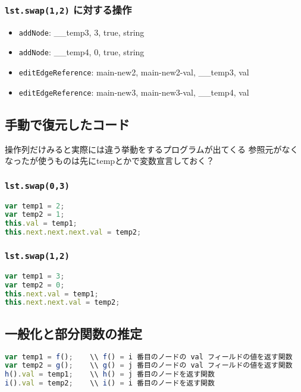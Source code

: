 \documentclass{article}
\begin{document}
\subsubsection{\texttt{lst.swap(1,2)} に対する操作}
\begin{itemize}
  \item \texttt{addNode}: \_\_temp3, 3, true, string
  \item \texttt{addNode}: \_\_temp4, 0, true, string
  \item \texttt{editEdgeReference}: main-new2, main-new2-val, \_\_temp3, val
  \item \texttt{editEdgeReference}: main-new3, main-new3-val, \_\_temp4, val
\end{itemize}

\subsection{手動で復元したコード}
操作列だけみると実際には違う挙動をするプログラムが出てくる
参照元がなくなったが使うものは先にtempとかで変数宣言しておく？
\subsubsection{\texttt{lst.swap(0,3)}}
\begin{lstlisting}[language=JavaScript]
var temp1 = 2;
var temp2 = 1;
this.val = temp1;
this.next.next.next.val = temp2;
\end{lstlisting}

\subsubsection{\texttt{lst.swap(1,2)}}
\begin{lstlisting}[language=JavaScript]
var temp1 = 3;
var temp2 = 0;
this.next.val = temp1;
this.next.next.val = temp2;
\end{lstlisting}

\subsection{一般化と部分関数の推定}
\begin{lstlisting}[language=JavaScript]
var temp1 = f();    \\ f() = i 番目のノードの val フィールドの値を返す関数
var temp2 = g();    \\ g() = j 番目のノードの val フィールドの値を返す関数
h().val = temp1;    \\ h() = j 番目のノードを返す関数
i().val = temp2;    \\ i() = i 番目のノードを返す関数
\end{lstlisting}
\end{document}
